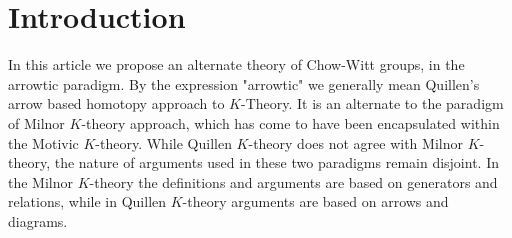 \documentclass[12pt]{article}
\begin{document}
\tableofcontents








\section{Introduction} \label{SecIntro}
In this article we propose an alternate theory of Chow-Witt groups, in the arrowtic paradigm. By the expression 
"arrowtic" we generally mean Quillen's arrow based homotopy approach to $K$-Theory. It is an alternate to
the paradigm of Milnor $K$-theory approach, which has come to have been encapsulated within the Motivic $K$-theory. While Quillen $K$-theory does not agree with Milnor $K$-theory, 
the nature of arguments used in these two paradigms remain disjoint. 
 In the Milnor $K$-theory  the definitions and arguments are based on generators and relations, while  in Quillen $K$-theory arguments are based on arrows and diagrams. 
\end{document}
